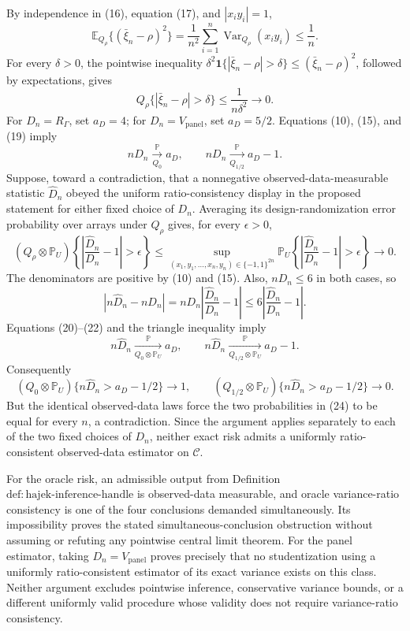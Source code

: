 By independence in (16), equation (17), and \(|x_i y_i|=1\),
\[
\mathbb E_{Q_\rho}\{(\bar\xi_n-\rho)^2\}
=\frac1{n^2}\sum_{i=1}^n\operatorname{Var}_{Q_\rho}(x_i y_i)
\le\frac1n.
\tag{18}
\]
For every \(\delta>0\), the pointwise inequality
\(\delta^2\mathbf 1\{|\bar\xi_n-\rho|>\delta\}\le(\bar\xi_n-\rho)^2\), followed by expectations, gives
\[
Q_\rho\{|\bar\xi_n-\rho|>\delta\}
\le\frac1{n\delta^2}\longrightarrow0.
\tag{19}
\]
For \(D_n=R_\Gamma\), set \(a_D=4\); for \(D_n=V_{\mathrm{panel}}\), set \(a_D=5/2\).  Equations (10), (15), and (19) imply
\[
nD_n\xrightarrow[Q_0]{\mathbb P}a_D,
\qquad
nD_n\xrightarrow[Q_{1/2}]{\mathbb P}a_D-1.
\tag{20}
\]
Suppose, toward a contradiction, that a nonnegative observed-data-measurable statistic \(\widehat D_n\) obeyed the uniform ratio-consistency display in the proposed statement for either fixed choice of \(D_n\).  Averaging its design-randomization error probability over arrays under \(Q_\rho\) gives, for every \(\epsilon>0\),
\[
(Q_\rho\otimes\mathbb P_U)
\!\left\{\left|\frac{\widehat D_n}{D_n}-1\right|>\epsilon\right\}
\le
\sup_{(x_1,y_1,\ldots,x_n,y_n)\in\{-1,1\}^{2n}}
\mathbb P_U
\!\left\{\left|\frac{\widehat D_n}{D_n}-1\right|>\epsilon\right\}
\longrightarrow0.
\tag{21}
\]
The denominators are positive by (10) and (15).  Also, \(nD_n\le6\) in both cases, so
\[
|n\widehat D_n-nD_n|
=nD_n\left|\frac{\widehat D_n}{D_n}-1\right|
\le6\left|\frac{\widehat D_n}{D_n}-1\right|.
\tag{22}
\]
Equations (20)--(22) and the triangle inequality imply
\[
n\widehat D_n\xrightarrow[Q_0\otimes\mathbb P_U]{\mathbb P}a_D,
\qquad
n\widehat D_n\xrightarrow[Q_{1/2}\otimes\mathbb P_U]{\mathbb P}a_D-1.
\tag{23}
\]
Consequently
\[
(Q_0\otimes\mathbb P_U)\{n\widehat D_n>a_D-1/2\}\longrightarrow1,
\qquad
(Q_{1/2}\otimes\mathbb P_U)\{n\widehat D_n>a_D-1/2\}\longrightarrow0.
\tag{24}
\]
But the identical observed-data laws force the two probabilities in (24) to be equal for every \(n\), a contradiction.  Since the argument applies separately to each of the two fixed choices of \(D_n\), neither exact risk admits a uniformly ratio-consistent observed-data estimator on \(\mathcal C\).

For the oracle risk, an admissible output from Definition \(\mathrm{def:hajek\text{-}inference\text{-}handle}\) is observed-data measurable, and oracle variance-ratio consistency is one of the four conclusions demanded simultaneously.  Its impossibility proves the stated simultaneous-conclusion obstruction without assuming or refuting any pointwise central limit theorem.  For the panel estimator, taking \(D_n=V_{\mathrm{panel}}\) proves precisely that no studentization using a uniformly ratio-consistent estimator of its exact variance exists on this class.  Neither argument excludes pointwise inference, conservative variance bounds, or a different uniformly valid procedure whose validity does not require variance-ratio consistency.

